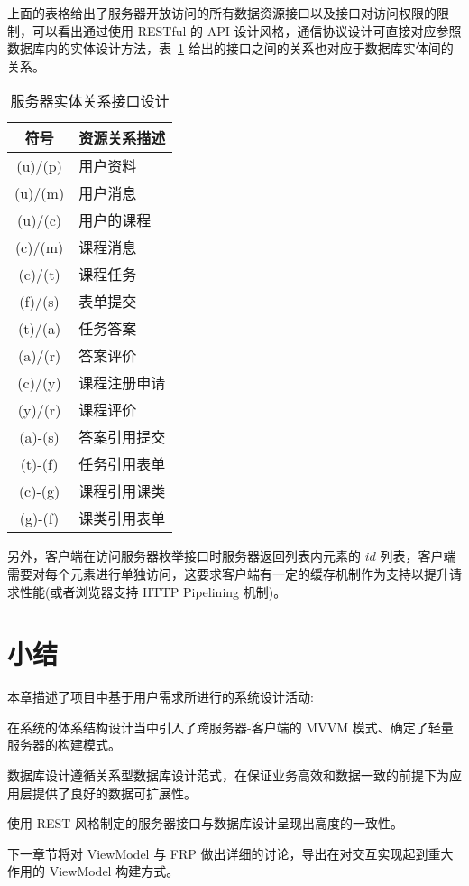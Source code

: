 
上面的表格给出了服务器开放访问的所有数据资源接口以及接口对访问权限的限制，可以看出通过使用 RESTful 的 API 设计风格，通信协议设计可直接对应参照数据库内的实体设计方法，表~\ref{APURIRelation} 给出的接口之间的关系也对应于数据库实体间的关系。

\begin{table}[!h]
  \begin{center}
    \noindent
    \ttfamily
    \begin{tabular}{|c|l|}
      \hline
      \textbf{符号} & \textbf{资源关系描述} \\ \hline
      (u)/(p) & 用户资料     \\ \hline
      (u)/(m) & 用户消息     \\ \hline
      (u)/(c) & 用户的课程   \\ \hline
      (c)/(m) & 课程消息     \\ \hline
      (c)/(t) & 课程任务     \\ \hline
      (f)/(s) & 表单提交     \\ \hline
      (t)/(a) & 任务答案     \\ \hline
      (a)/(r) & 答案评价     \\ \hline
      (c)/(y) & 课程注册申请 \\ \hline
      (y)/(r) & 课程评价     \\ \hline
      (a)-(s) & 答案引用提交 \\ \hline
      (t)-(f) & 任务引用表单 \\ \hline
      (c)-(g) & 课程引用课类 \\ \hline
      (g)-(f) & 课类引用表单 \\ \hline
    \end{tabular}
    \caption{服务器实体关系接口设计\label{APURIRelation}}
  \end{center}
\end{table}

另外，客户端在访问服务器枚举接口时服务器返回列表内元素的 $id$ 列表，客户端需要对每个元素进行单独访问，这要求客户端有一定的缓存机制作为支持以提升请求性能(或者浏览器支持 HTTP Pipelining 机制)。

\newpage

\section{小结}

本章描述了项目中基于用户需求所进行的系统设计活动:

在系统的体系结构设计当中引入了跨服务器-客户端的 MVVM 模式、确定了轻量服务器的构建模式。

数据库设计遵循关系型数据库设计范式，在保证业务高效和数据一致的前提下为应用层提供了良好的数据可扩展性。

使用 REST 风格制定的服务器接口与数据库设计呈现出高度的一致性。

下一章节将对 ViewModel 与 FRP 做出详细的讨论，导出在对交互实现起到重大作用的 ViewModel 构建方式。

